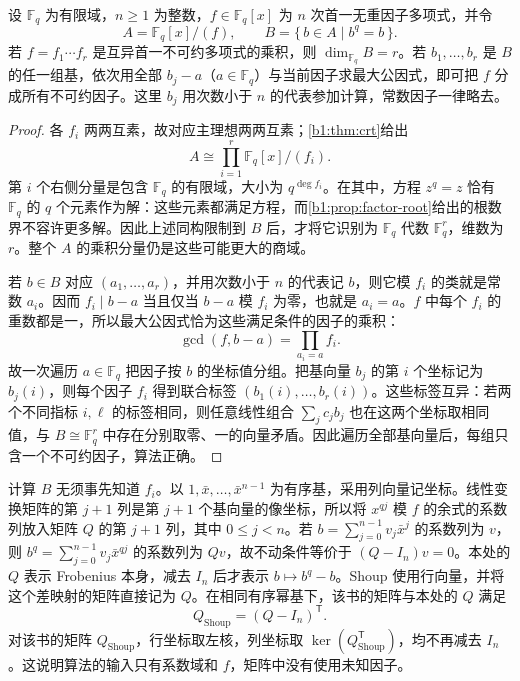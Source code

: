 \begin{proposition}\label{b1:prop:B-berlekamp}
	设 \(\mathbb F_q\) 为有限域，\(n\geq1\) 为整数，\(f\in\mathbb F_q[x]\) 为 \(n\) 次首一无重因子多项式，并令
	\[
		A=\mathbb F_q[x]/(f),\qquad B=\{\,b\in A\mid b^q=b\,\}.
	\]
	若 \(f=f_1\cdots f_r\) 是互异首一不可约多项式的乘积，则 \(\dim_{\mathbb F_q}B=r\)。若 \(b_1,\ldots,b_r\) 是 \(B\) 的任一组基，依次用全部 \(b_j-a\)（\(a\in\mathbb F_q\)）与当前因子求最大公因式，即可把 \(f\) 分成所有不可约因子。这里 \(b_j\) 用次数小于 \(n\) 的代表参加计算，常数因子一律略去。
\end{proposition}

\begin{proof}
	各 \(f_i\) 两两互素，故对应主理想两两互素；\cref{b1:thm:crt}给出
	\[
		A\cong\prod_{i=1}^r\mathbb F_q[x]/(f_i).
	\]
	第 \(i\) 个右侧分量是包含 \(\mathbb F_q\) 的有限域，大小为 \(q^{\deg f_i}\)。在其中，方程 \(z^q=z\) 恰有 \(\mathbb F_q\) 的 \(q\) 个元素作为解：这些元素都满足方程，而\cref{b1:prop:factor-root}给出的根数界不容许更多解。因此上述同构限制到 \(B\) 后，才将它识别为 \(\mathbb F_q\) 代数 \(\mathbb F_q^r\)，维数为 \(r\)。整个 \(A\) 的乘积分量仍是这些可能更大的商域。

	若 \(b\in B\) 对应 \((a_1,\ldots,a_r)\)，并用次数小于 \(n\) 的代表记 \(b\)，则它模 \(f_i\) 的类就是常数 \(a_i\)。因而 \(f_i\mid b-a\) 当且仅当 \(b-a\) 模 \(f_i\) 为零，也就是 \(a_i=a\)。\(f\) 中每个 \(f_i\) 的重数都是一，所以最大公因式恰为这些满足条件的因子的乘积：
	\[
		\gcd(f,b-a)=\prod_{a_i=a}f_i.
	\]
	故一次遍历 \(a\in\mathbb F_q\) 把因子按 \(b\) 的坐标值分组。把基向量 \(b_j\) 的第 \(i\) 个坐标记为 \(b_j(i)\)，则每个因子 \(f_i\) 得到联合标签 \((b_1(i),\ldots,b_r(i))\)。这些标签互异：若两个不同指标 \(i,\ell\) 的标签相同，则任意线性组合 \(\sum_j c_jb_j\) 也在这两个坐标取相同值，与 \(B\cong\mathbb F_q^r\) 中存在分别取零、一的向量矛盾。因此遍历全部基向量后，每组只含一个不可约因子，算法正确。
\end{proof}

计算 \(B\) 无须事先知道 \(f_i\)。以 \(1,\bar x,\ldots,\bar x^{n-1}\) 为有序基，采用列向量记坐标。线性变换矩阵的第 \(j+1\) 列是第 \(j+1\) 个基向量的像坐标，所以将 \(x^{qj}\) 模 \(f\) 的余式的系数列放入矩阵 \(Q\) 的第 \(j+1\) 列，其中 \(0\leq j<n\)。若 \(b=\sum_{j=0}^{n-1}v_j\bar x^j\) 的系数列为 \(v\)，则 \(b^q=\sum_{j=0}^{n-1}v_j\bar x^{qj}\) 的系数列为 \(Qv\)，故不动条件等价于 \((Q-I_n)v=0\)。本处的 \(Q\) 表示 Frobenius 本身，减去 \(I_n\) 后才表示 \(b\mapsto b^q-b\)。Shoup 使用行向量，并将这个差映射的矩阵直接记为 \(Q\)\cite[Section 20.5]{Shoup2008NumberTheoryAlgebra}。在相同有序幂基下，该书的矩阵与本处的 \(Q\) 满足
\[
	Q_{\mathrm{Shoup}}=(Q-I_n)^{\mathsf T}.
\]
对该书的矩阵 \(Q_{\mathrm{Shoup}}\)，行坐标取左核，列坐标取 \(\ker(Q_{\mathrm{Shoup}}^{\mathsf T})\)，均不再减去 \(I_n\)。这说明算法的输入只有系数域和 \(f\)，矩阵中没有使用未知因子。


